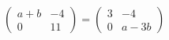 $\begin{pmatrix} a+b & -4 \\ 0 & 11 \end{pmatrix}=\begin{pmatrix} 3 & -4 \\ 0 & a-3b \end{pmatrix}$
